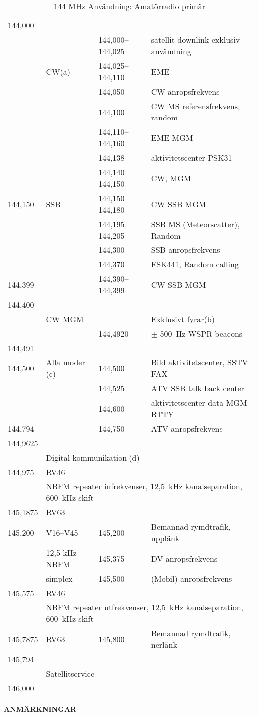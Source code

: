 \setlongtables
\small
\begin{longtable}{llll}
\caption{144 MHz Användning: Amatörradio primär}\\

144,000 & & &\\
        & & 144,000--144,025 & satellit downlink exklusiv användning\\
        & CW(a) & 144,025--144,110 & EME\\
        & & 144,050 & CW anropsfrekvens \\
        & & 144,100 & CW MS referensfrekvens, random\\
        & & 144,110--144,160 & EME MGM\\
        & & 144,138 & aktivitetscenter PSK31\\
        & & 144,140--144,150 & CW, MGM\\
144,150 & SSB & 144,150--144,180 & CW SSB MGM\\
        & & 144,195--144,205 & SSB MS (Meteorscatter), Random\\
        & & 144,300 & SSB anropsfrekvens\\
        & & 144,370 & FSK441, Random calling\\
144,399 & & 144,390--144,399 & CW SSB MGM\\
144,400 & & &\\
        & CW MGM & & Exklusivt fyrar(b)\\
        & & 144,4920 & \(\pm\) 500~Hz WSPR beacons\\
144,491 & & &\\
144,500 & Alla moder (c) & 144,500 & Bild aktivitetscenter, SSTV FAX\\
        & & 144,525 & ATV SSB talk back center \\
        & & 144,600 & aktivitetscenter data MGM RTTY\\
144,794 & & 144,750 & ATV anropsfrekvens \\
144,9625 & & & \\
        & \multicolumn{3}{l}{Digital kommunikation (d)}\\
144,975 & RV46 & &\\
        & \multicolumn{3}{l}{NBFM repeater infrekvenser, 12,5~kHz kanalseparation, 600~kHz skift} \\
145,1875 & RV63 & & \\
145,200 & V16--V45 & 145,200 & Bemannad rymdtrafik, upplänk \\
        & 12,5 kHz NBFM & 145,375 & DV anropsfrekvens\\
        & simplex & 145,500 & (Mobil) anropsfrekvens\\
145,575 & RV46 & & \\
        & \multicolumn{3}{l}{NBFM repeater utfrekvenser, 12,5~kHz kanalseparation, 600~kHz skift} \\
145,7875 & RV63 & 145,800 & Bemannad rymdtrafik, nerlänk \\
145,794 & & & \\
        & \multicolumn{3}{l}{Satellitservice} \\
146,000 & & & \\
\end{longtable}
\normalsize
\textbf{ANMÄRKNINGAR}

